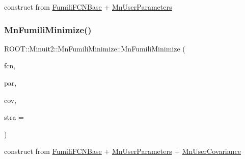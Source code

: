 construct from \mbox{\hyperlink{classROOT_1_1Minuit2_1_1FumiliFCNBase}{Fumili\+F\+C\+N\+Base}} + \mbox{\hyperlink{classROOT_1_1Minuit2_1_1MnUserParameters}{Mn\+User\+Parameters}} 

\mbox{\label{classROOT_1_1Minuit2_1_1MnFumiliMinimize_a3dd4f225ca0cdfdc6eb542ee32667984}} 
\subsubsection{\texorpdfstring{MnFumiliMinimize()}{MnFumiliMinimize()}\hspace{0.1cm}{\footnotesize\ttfamily [19/21]}}
{\footnotesize\ttfamily R\+O\+O\+T\+::\+Minuit2\+::\+Mn\+Fumili\+Minimize\+::\+Mn\+Fumili\+Minimize (\begin{DoxyParamCaption}\item[{const \mbox{\hyperlink{classROOT_1_1Minuit2_1_1FumiliFCNBase}{Fumili\+F\+C\+N\+Base}} \&}]{fcn,  }\item[{const \mbox{\hyperlink{classROOT_1_1Minuit2_1_1MnUserParameters}{Mn\+User\+Parameters}} \&}]{par,  }\item[{const \mbox{\hyperlink{classROOT_1_1Minuit2_1_1MnUserCovariance}{Mn\+User\+Covariance}} \&}]{cov,  }\item[{unsigned int}]{stra = {} }\end{DoxyParamCaption})\hspace{0.3cm}{\ttfamily [inline]}}



construct from \mbox{\hyperlink{classROOT_1_1Minuit2_1_1FumiliFCNBase}{Fumili\+F\+C\+N\+Base}} + \mbox{\hyperlink{classROOT_1_1Minuit2_1_1MnUserParameters}{Mn\+User\+Parameters}} + \mbox{\hyperlink{classROOT_1_1Minuit2_1_1MnUserCovariance}{Mn\+User\+Covariance}} 

\mbox{\label{classROOT_1_1Minuit2_1_1MnFumiliMinimize_ad8292150eb4f2642fb583f0cec00ed7b}} 
